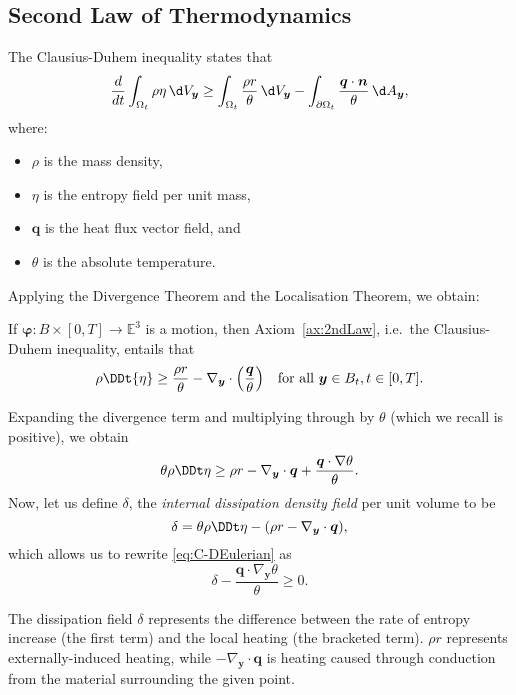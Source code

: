 \documentclass[
  letterpaper,
  DIV=11,
  numbers=noendperiod]{scrreprt}
\theoremstyle{plain}
\theoremstyle{remark}
\begin{document}
\subsection{Second Law of
Thermodynamics}\label{second-law-of-thermodynamics}

The Clausius-Duhem inequality states that
\[\frac{d}{dt}\int_{\Omega_t} \rho\eta{\,\d V_{{\boldsymbol{y}}}}\geq \int_{\Omega_t}\frac{\rho r}{\theta}{\,\d V_{{\boldsymbol{y}}}}-\int_{\partial\Omega_t}\frac{{\boldsymbol{q}}\cdot{\boldsymbol{n}}}{\theta}{\,\d A_{{\boldsymbol{y}}}},\]
where:

\begin{itemize}
\item
  \(\rho\) is the mass density,
\item
  \(\eta\) is the entropy field per unit mass,
\item
  \({\boldsymbol{q}}\) is the heat flux vector field, and
\item
  \(\theta\) is the absolute temperature.
\end{itemize}

Applying the Divergence Theorem and the Localisation Theorem, we obtain:

If \({\boldsymbol{\varphi}}:B\times[0,T]\to{\mathbb{E}}^3\) is a motion,
then Axiom~\hyperref[ax:2ndLaw]{{[}ax:2ndLaw{]}}, i.e.~the
Clausius-Duhem inequality, entails that
\[\rho\DDt{\eta}\geq \frac{\rho r}{\theta}-\nabla_{\boldsymbol{y}}\cdot\Big(\frac{\boldsymbol{q}}\theta\Big)\quad\text{for all }{\boldsymbol{y}}\in B_t, t\in[0,T].\]

Expanding the divergence term and multiplying through by \(\theta\)
(which we recall is positive), we obtain \[\label{eq:C-DEulerian}
  \theta\rho\DDt\eta\geq \rho r-\nabla_{\boldsymbol{y}}\cdot{\boldsymbol{q}}+\frac{{\boldsymbol{q}}\cdot\nabla\theta}{\theta}.\]
Now, let us define \(\delta\), the \emph{internal dissipation density
field} per unit volume to be
\[\delta = \theta\rho\DDt\eta-(\rho r-\nabla_{\boldsymbol{y}}\cdot{\boldsymbol{q}}),\]
which allows us to rewrite
\hyperref[eq:C-DEulerian]{{[}eq:C-DEulerian{]}} as
\[\label{eq:C-DEulerian2}
  \delta-\frac{{\boldsymbol{q}}\cdot\nabla_{\boldsymbol{y}}\theta}{\theta}\geq0.\]

The dissipation field \(\delta\) represents the difference between the
rate of entropy increase (the first term) and the local heating (the
bracketed term). \(\rho r\) represents externally-induced heating, while
\(-\nabla_{\boldsymbol{y}}\cdot{\boldsymbol{q}}\) is heating caused
through conduction from the material surrounding the given point.
\end{document}
